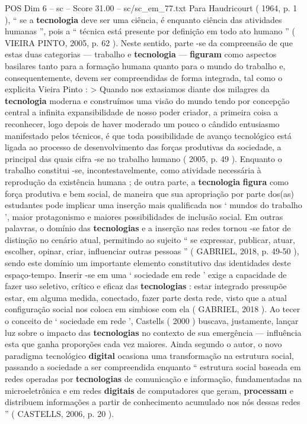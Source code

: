 \begin{textsample}{POS Dim 6 – sc – Score 31.00 – sc/sc\_em\_77.txt}
Para Haudricourt ( 1964, p. 1 ), “ se a \textbf{tecnologia} deve ser uma ciência, é enquanto ciência das atividades humanas ”, pois a “ técnica está presente por definição em todo ato humano ” ( VIEIRA PINTO, 2005, p. 62 ).
Neste sentido, parte -se da compreensão de que estas duas categorias — trabalho e \textbf{tecnologia} — \textbf{figuram} como aspectos basilares tanto para a formação humana quanto para o mundo do trabalho e, consequentemente, devem ser compreendidas de forma integrada, tal como o explicita Vieira Pinto : > Quando nos extasiamos diante dos milagres da \textbf{tecnologia} moderna e construímos uma visão do mundo tendo por concepção central a infinita expansibilidade de nosso poder criador, a primeira coisa a reconhecer, logo depois de haver moderado um pouco o cândido entusiasmo manifestado pelos técnicos, é que toda possibilidade de avanço tecnológico está ligada ao processo de desenvolvimento das forças produtivas da sociedade, a principal das quais cifra -se no trabalho humano ( 2005, p. 49 ).
Enquanto o trabalho constitui -se, incontestavelmente, como atividade necessária à reprodução da existência humana ; de outra parte, a \textbf{tecnologia} \textbf{figura} como força produtiva e bem social, de maneira que sua apropriação por parte dos(as) estudantes pode implicar uma inserção mais qualificada nos ‘ mundos do trabalho ’, maior protagonismo e maiores possibilidades de inclusão social.
Em outras palavras, o domínio das \textbf{tecnologias} e a inserção nas redes tornou -se fator de distinção no cenário atual, permitindo ao sujeito “ se expressar, publicar, atuar, escolher, opinar, criar, influenciar outras pessoas ” ( GABRIEL, 2018, p. 49-50 ), sendo este domínio um importante elemento constitutivo das identidades deste espaço-tempo.
Inserir -se em uma ‘ sociedade em rede ’ exige a capacidade de fazer uso seletivo, crítico e eficaz das \textbf{tecnologias} : estar integrado pressupõe estar, em alguma medida, conectado, fazer parte desta rede, visto que a atual configuração social nos coloca em simbiose com ela ( GABRIEL, 2018 ).
Ao tecer o conceito de ‘ sociedade em rede ’, Castells ( 2000 ) buscava, justamente, lançar luz sobre o impacto das \textbf{tecnologias} no contexto de sua emergência — influência esta que ganha proporções cada vez maiores.
Ainda segundo o autor, o novo paradigma tecnológico \textbf{digital} ocasiona uma transformação na estrutura social, passando a sociedade a ser compreendida enquanto “ estrutura social baseada em redes operadas por \textbf{tecnologias} de comunicação e informação, fundamentadas na microeletrônica e em redes \textbf{digitais} de computadores que geram, \textbf{processam} e distribuem informações a partir de conhecimento acumulado nos nós dessas redes ” ( CASTELLS, 2006, p. 20 ).

\end{textsample}

